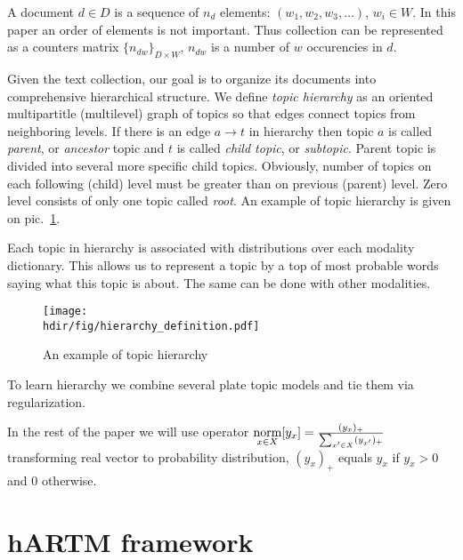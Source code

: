 \documentclass[12pt, twoside]{article}
\newcommand{\hdir}{.}
\begin{document}
A document $d \in D$ is a sequence of $n_d$ elements: $(w_1, w_2, w_3, \dots)$, $w_i \in W$. In this paper an order of elements is not important. Thus collection can be represented as a counters matrix $\{n_{dw}\}_{D \times W}$, $n_{dw}$ is a number of $w$ occurencies in $d$.

Given the text collection, our goal is to organize its documents into comprehensive hierarchical structure. We define \emph{topic hierarchy} as an oriented multipartitle (multilevel) graph of topics so that edges connect topics from neighboring levels. If there is an edge $a \rightarrow t$ in hierarchy then topic $a$ is called \emph{parent}, or \emph{ancestor} topic and $t$ is called \emph{child topic}, or \emph{subtopic}. Parent topic is divided into several more specific child topics. 
Obviously, number of topics on each following (child) level must be greater than on previous (parent) level. Zero level consists of only one topic called \emph{root}. An example of topic hierarchy is given on pic.~\ref{fg:hierarchy}.

Each topic in hierarchy is associated with distributions over each modality dictionary. This allows us to represent a topic by a top of most probable words saying what this topic is about. The same can be done with other modalities.
\begin{figure}[!th]
	\begin{center}
		\texttt{[image: \\hdir/fig/hierarchy\_definition.pdf]}
	\end{center}
	\caption{An example of topic hierarchy}
	\label{fg:hierarchy}
\end{figure}

To learn hierarchy we combine several plate topic models and tie them via regularization.

In the rest of the paper we will use operator 
$\mathop{\text{norm}}\limits_{x \in X} [y_x] = \frac{( y_x )_+}
{\sum_{x' \in X}( y_{x'})_+}$ transforming real vector to probability distribution, $(y_x)_+$ equals $y_x$ if $y_x > 0$ and $0$ otherwise.



\section{hARTM framework}
\end{document}
